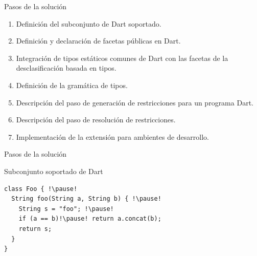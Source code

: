 \documentclass[aspectratio=169,10pt]{beamer}
\begin{document}
\begin{frame}[fragile]{Pasos de la solución}
	\begin{enumerate}
		\item Definición del subconjunto de Dart soportado.
		\item Definición y declaración de facetas públicas en Dart.
		\item Integración de tipos estáticos comunes de Dart con las facetas de la desclasificación basada en tipos.
		\item Definición de la gramática de tipos.
		\item Descripción del paso de generación de restricciones para un programa Dart.
		\item Descripción del paso de resolución de restricciones.
		\item Implementación de la extensión para ambientes de desarrollo.
	\end{enumerate}
\end{frame}

\begin{frame}[fragile]{Pasos de la solución}
\end{frame}

\begin{frame}[fragile]{Subconjunto soportado de Dart}
	\begin{center}
	\begin{lstlisting}[escapechar=!,basicstyle=\fontsize{9}{11}\ttfamily]
class Foo { !\pause!
  String foo(String a, String b) { !\pause!
    String s = "foo"; !\pause!
    if (a == b)!\pause! return a.concat(b);
    return s;
  }
}
  \end{lstlisting}
	\end{center}
\end{frame}
\end{document}
